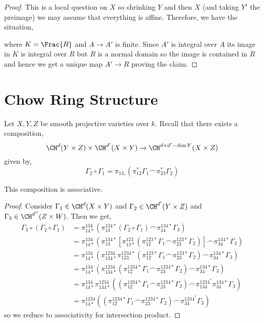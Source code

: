 \documentclass[12pt]{article}
\begin{document}
\begin{proof}
This is a local question on $X$ so shrinking $Y$ and then $X$ (and taking $Y'$ the preimage) we may assume that everything is affine. Therefore, we have the situation,
\begin{center}
\end{center}
where $K = \Frac{R}$ and $A \to A'$ is finite. Since $A'$ is integral over $A$ its image in $K$ is integral over $R$ but $R$ is a normal domain so the image is contained in $R$ and hence we get a unique map $A' \to R$ proving the claim. 
\end{proof}

\section{Chow Ring Structure}

Let $X, Y, Z$ be smooth projective varieties over $k$. Recall that there exists a composition,
\[ \CH^{d}(Y \times Z) \times \CH^{d'}(X \times Y) \to \CH^{d+d' - \dim{Y}}(X \times Z) \]
given by,
\[ \Gamma_2 \circ \Gamma_1 = \pi_{13_*}(\pi_{12}^* \Gamma_1 \frown \pi_{23}^* \Gamma_2) \]

\begin{lemma}
This composition is associative.
\end{lemma}

\begin{proof}
Consider $\Gamma_1 \in \CH^{d}(X \times Y)$ and $\Gamma_2 \in \CH^{d'}(Y \times Z)$ and $\Gamma_3 \in \CH^{d''}(Z \times W)$. Then we get,
\begin{align*}
\Gamma_3 \circ (\Gamma_2 \circ \Gamma_1) &= \pi^{134}_{14 *} (\pi_{13}^{134*} (\Gamma_2 \circ \Gamma_1) \frown \pi_{34}^{134*} \Gamma_3)
\\
&= \pi^{134}_{14 *} (\pi_{13}^{134*} [\pi^{123}_{13*} (\pi^{123*}_{12} \Gamma_1 \frown \pi^{123*}_{23} \Gamma_2)] \frown \pi_{34}^{134*} \Gamma_3)
\\
&= \pi^{134}_{14 *} ( \pi^{1234}_{134*} \pi^{1234*}_{123} (\pi^{123*}_{12} \Gamma_1 \frown \pi^{123*}_{23} \Gamma_2) \frown \pi_{34}^{134*} \Gamma_3)
\\
&= \pi^{134}_{14 *} ( \pi^{1234}_{134*} (\pi^{1234*}_{12} \Gamma_1 \frown \pi^{1234*}_{23} \Gamma_2) \frown \pi_{34}^{134*} \Gamma_3)
\\
&= \pi^{134}_{14 *}  \pi^{1234}_{134*} ((\pi^{1234*}_{12} \Gamma_1 \frown \pi^{1234*}_{23} \Gamma_2) \frown  \pi^{1234^*}_{134} \pi_{34}^{134*} \Gamma_3)
\\
& = \pi^{1234}_{14*} ((\pi^{1234*}_{12} \Gamma_1 \frown \pi^{1234*}_{23} \Gamma_2) \frown  \pi^{1234^*}_{34} \Gamma_3)
\end{align*}
so we reduce to associativity for intersection product.
\end{proof}
\end{document}
